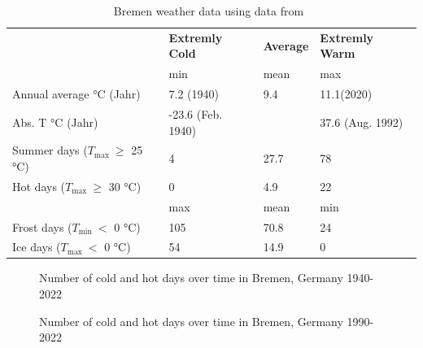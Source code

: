\documentclass[12pt,a4paper, english,twoside]{scrartcl}
\begin{document}
    \begin{table}[ht]
        \centering
        \caption{Bremen weather data using data from~\cite{DWD2024a}\label{tab:statsBremen}}
        \renewcommand{\arraystretch}{1.4}
        \begin{tabular}{p{3.4cm}p{2.5cm}lp{2.5cm}}
          \toprule
          & \textbf{Extremly Cold} & \textbf{Average} & \textbf{Extremly Warm} \\
          & min & mean & max \\
          \midrule
          Annual average °C \newline (Jahr)     &   7.2 \newline(1940)       & 9.4    & 11.1\newline (2020)      \\
          Abs. T °C \newline (Jahr)             & -23.6 \newline(Feb. 1940)  &        & 37.6 \newline(Aug. 1992) \\
          Summer days \newline($T_{\max}~\ge$  25 °C) & 4                    & 27.7   & 78 \\
          Hot days \newline($T_{\max}~\ge$  30 °C)    & 0                    & 4.9    & 22 \\
          \midrule
          & max & mean & min \\
          \midrule
          Frost days \newline($T_{\min}~<$  0 °C)     & 105         & 70.8   & 24 \\
          Ice days \newline($T_{\max}~<$  0 °C)       & 54          & 14.9   & 0  \\
          \bottomrule
        \end{tabular}
      \end{table}
\newpage
\begin{landscape}
      \begin{figure}[!p]
          
        \caption{Number of cold and hot days over time in Bremen, Germany 1940-2022\label{fig:breTempExtr1}}
      \end{figure}
\end{landscape}
\begin{landscape}
      \begin{figure}[!p]
           
           \caption{Number of cold and hot days over time in Bremen, Germany 1990-2022\label{fig:breTempExtr2}}
      \end{figure}
\end{landscape}
\end{document}
